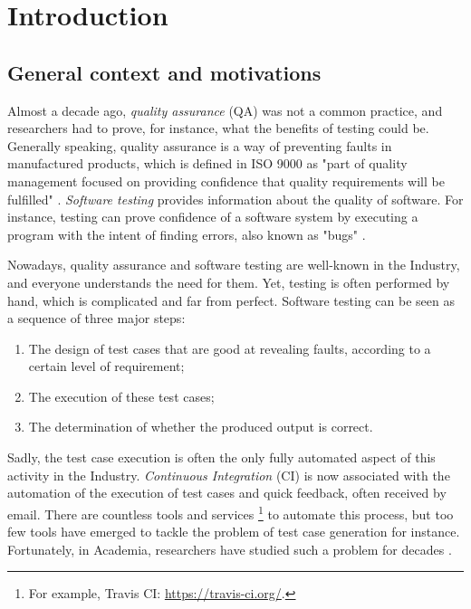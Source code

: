 %
\chapter{Introduction}
\label{sec:intro}

\minitoc

\section{General context and motivations}

Almost a decade ago, \emph{quality assurance} (QA) was not a
common practice, and researchers had to prove, for instance, what
the benefits of testing could be. Generally speaking, quality
assurance is a way of preventing faults in manufactured products,
which is defined in ISO 9000 as "part of quality management
focused on providing confidence that quality requirements will be
fulfilled" \cite{iso20059000}. \emph{Software testing} provides
information about the quality of software. For instance, testing
can prove confidence of a software system by executing a program
with the intent of finding errors, also known as "bugs"
\cite{Myers:1979:AST:539883}.

Nowadays, quality assurance and software testing are well-known
in the Industry, and everyone understands the need for them.
Yet, testing is often performed by hand, which is complicated
and far from perfect. Software testing can be seen as a sequence
of three major steps:

\begin{enumerate}
    \item The design of test cases that are good at revealing
        faults, according to a certain level of requirement;

    \item The execution of these test cases;

    \item The determination of whether the produced output is
        correct.
\end{enumerate}

Sadly, the test case execution is often the only fully automated
aspect of this activity in the Industry. \emph{Continuous
Integration} (CI) \cite{booch1991object} is now associated with
the automation of the execution of test cases and quick feedback,
often received by email. There are countless tools and services
\footnote{For example, Travis CI: \url{https://travis-ci.org/}.}
to automate this process, but too few tools have emerged to
tackle the problem of test case generation for instance.
Fortunately, in Academia, researchers have studied such a problem
for decades \cite{4221614}.

